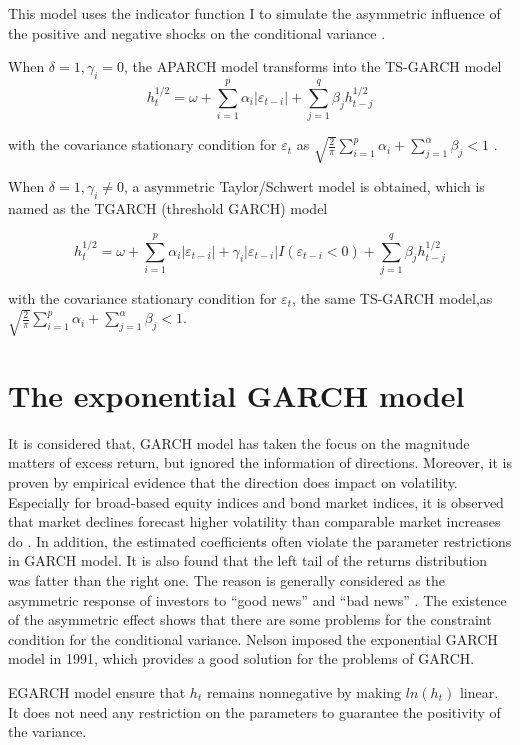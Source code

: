 This model uses the indicator function I to simulate the asymmetric influence of the positive and negative shocks on the conditional variance \citep{Glosten1993}.

When $\delta=1,\gamma_{i}=0$, the APARCH model transforms into the TS-GARCH model
\[h_{t}^{1/2} = \omega + \sum_{i=1}^{p}\alpha_{i}|\varepsilon_{t-i}|+\sum_{j=1}^{q}\beta_{j}h_{t-j}^{1/2}\]

with the covariance stationary condition for  $\varepsilon_{t}$ as  $\sqrt{\frac{2}{\pi}} \sum_{i=1}^{p}\alpha_{i} + \sum_{j=1}^{\alpha}\beta_{j}<1$
\citep{Schwert1990,stephen1986modelling}.

When $\delta=1,\gamma_{i}\neq0$, a asymmetric Taylor/Schwert model is obtained, which is named as the TGARCH (threshold GARCH) model

\[h_{t}^{1/2} = \omega + \sum_{i=1}^{p}\alpha_{i}|\varepsilon_{t-i}|+\gamma_i|\varepsilon_{t-i}|I(\varepsilon_{t-i}<0)+\sum_{j=1}^{q}\beta_{j}h_{t-j}^{1/2}\]

 with the covariance stationary condition for  $\varepsilon_{t}$, the same TS-GARCH model,as  $\sqrt{\frac{2}{\pi}} \sum_{i=1}^{p}\alpha_{i} + \sum_{j=1}^{\alpha}\beta_{j}<1$\citep{Zakoian1994}.


\section{The exponential GARCH model}

It is considered that, GARCH model has taken the focus on the magnitude matters of excess return, but ignored the information of directions. Moreover, it is proven by empirical evidence that the direction does impact on volatility. Especially for broad-based equity indices and bond market indices, it is observed that market declines forecast higher volatility than comparable market increases do \citep{Engle2001}. In addition, the estimated coefficients often violate the parameter restrictions in GARCH model. It is also found that the left tail of the returns distribution was fatter than the right one. The reason is generally considered as the asymmetric response of investors to “good news” and “bad news” \citep{Jondeau2003}. The existence of the asymmetric effect shows that there are some problems for the constraint condition for the  conditional variance. Nelson imposed the exponential GARCH model in 1991, which provides a good solution for the problems of GARCH. 

EGARCH model ensure that $h_{t}$  remains nonnegative by making $ln(h_{t})$ linear. It does not need any restriction on the parameters to guarantee the positivity of the variance.

